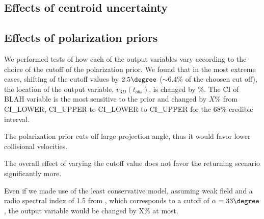 \label{sec: sensitivityTests}

\subsection{Effects of centroid uncertainty}


\subsection{Effects of polarization priors}
We performed tests of how each of the output variables vary according to the
choice of the cutoff of the polarization prior.
We found that in the most extreme cases, shifting of the cutoff values by
$2.5\degree$ ($\sim 6.4\%$ of the choosen cut off), the location of the output
variable, $v_{3D}(t_{obs})$, is changed by $\%$. The CI of BLAH variable is
the most sensitive to the prior and changed by $X\%$ from CI_LOWER, CI_UPPER to
CI_LOWER to CI_UPPER for the $68\%$ credible interval. 

The polarization prior cuts off large projection angle, thus it would
favor lower collisional velocities.

The overall effect of varying the cutoff value does not favor the
returning scenario significantly more. 

Even if we made use of the least conservative model, assuming weak field
and a radio spectral index of 1.5 from \cite{E98}, which
corresponds to a cutoff of $\alpha = 33\degree$, the output variable would
be changed by X\% at most. 





